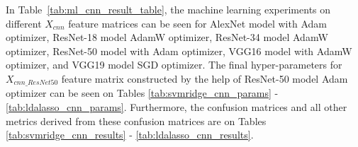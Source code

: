 In Table~\ref{tab:ml_cnn_result_table}, the machine learning experiments on different $X_{cnn}$ feature matrices can be seen for AlexNet model with Adam optimizer, ResNet-18 model AdamW optimizer, ResNet-34 model AdamW optimizer, ResNet-50 model with Adam optimizer, VGG16 model with AdamW optimizer, and VGG19 model SGD optimizer. The final hyper-parameters for $X_{cnn\_ResNet50}$ feature matrix constructed by the help of ResNet-50 model Adam optimizer can be seen on Tables \ref{tab:svmridge_cnn_params} - \ref{tab:ldalasso_cnn_params}. Furthermore, the confusion matrices and all other metrics derived from these confusion matrices are on Tables \ref{tab:svmridge_cnn_results} - \ref{tab:ldalasso_cnn_results}.

